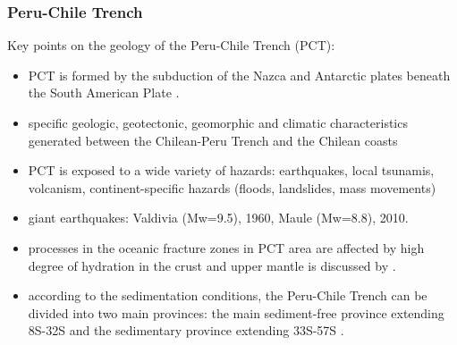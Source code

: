 \documentclass[pdflatex,compress,8pt,
	xcolor={dvipsnames,dvipsnames,svgnames,x11names,table},
	hyperref={colorlinks = true,breaklinks = true, urlcolor = NavyBlue, breaklinks = true}]{beamer}
\begin{document}
\begin{frame}\frametitle{Peru-Chile Trench}
Key points on the geology of the Peru-Chile Trench (PCT): 
\begin{itemize}
            \item PCT is formed by the subduction of the Nazca and Antarctic plates beneath the South American Plate \cite{BelloGonzalezetal2018}. 
            \item specific geologic, geotectonic, geomorphic and climatic characteristics generated between the Chilean-Peru Trench and the Chilean coasts
            \item PCT is exposed to a wide variety of hazards: earthquakes, local tsunamis, volcanism, continent-specific hazards (floods, landslides, mass movements)
            \item giant earthquakes: Valdivia (Mw=9.5), 1960, Maule (Mw=8.8), 2010. 
            \item processes in the oceanic fracture zones in PCT area are affected by high degree of hydration in the crust and upper mantle is discussed by \cite{Contreras2008}. 
            \item according to the sedimentation conditions, the Peru-Chile Trench can be divided into two main provinces: the main sediment-free province extending 8\degree S-32\degree S and the sedimentary province extending 33\degree S-57\degree S \cite{Hayes}. 
 \end{itemize}
 \end{frame}           
 
\end{document}
